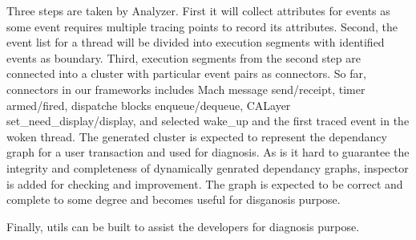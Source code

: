 Three steps are taken by Analyzer. First it will collect attributes for events as some event requires multiple tracing points to record its attributes.
Second, the event list for a thread will be divided into execution segments with identified events as boundary.
Third, execution segments from the second step are connected into a cluster with particular event pairs as connectors.
So far, connectors in our frameworks includes Mach message send/receipt, timer armed/fired, dispatche blocks enqueue/dequeue, CALayer set\_need\_display/display, and selected wake\_up and the first traced event in the woken thread.
The generated cluster is expected to represent the dependancy graph for a user transaction and used for diagnosis.
As is it hard to guarantee the integrity and completeness of dynamically genrated dependancy graphs, inspector is added for checking and improvement.
The graph is expected to be correct and complete to some degree and becomes useful for disganosis purpose.

Finally, utils can be built to assist the developers for diagnosis purpose.
